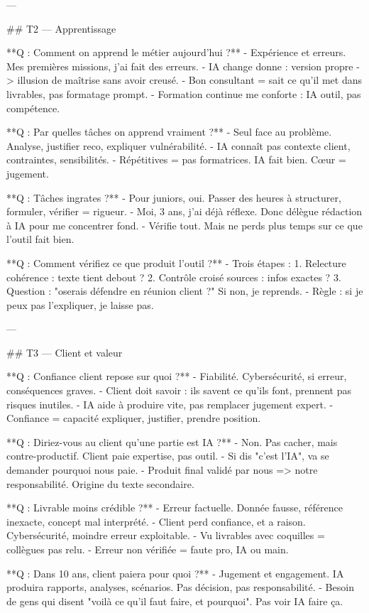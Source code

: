---

## T2 — Apprentissage

**Q : Comment on apprend le métier aujourd'hui ?**
- Expérience et erreurs. Mes premières missions, j'ai fait des erreurs.
- IA change donne : version propre -> illusion de maîtrise sans avoir creusé.
- Bon consultant = sait ce qu'il met dans livrables, pas formatage prompt.
- Formation continue me conforte : IA outil, pas compétence.

**Q : Par quelles tâches on apprend vraiment ?**
- Seul face au problème. Analyse, justifier reco, expliquer vulnérabilité.
- IA connaît pas contexte client, contraintes, sensibilités.
- Répétitives = pas formatrices. IA fait bien. Cœur = jugement.

**Q : Tâches ingrates ?**
- Pour juniors, oui. Passer des heures à structurer, formuler, vérifier = rigueur.
- Moi, 3 ans, j'ai déjà réflexe. Donc délègue rédaction à IA pour me concentrer fond.
- Vérifie tout. Mais ne perds plus temps sur ce que l'outil fait bien.

**Q : Comment vérifiez ce que produit l'outil ?**
- Trois étapes :
  1. Relecture cohérence : texte tient debout ?
  2. Contrôle croisé sources : infos exactes ?
  3. Question : "oserais défendre en réunion client ?" Si non, je reprends.
- Règle : si je peux pas l'expliquer, je laisse pas.

---

## T3 — Client et valeur

**Q : Confiance client repose sur quoi ?**
- Fiabilité. Cybersécurité, si erreur, conséquences graves.
- Client doit savoir : ils savent ce qu'ils font, prennent pas risques inutiles.
- IA aide à produire vite, pas remplacer jugement expert.
- Confiance = capacité expliquer, justifier, prendre position.

**Q : Diriez-vous au client qu'une partie est IA ?**
- Non. Pas cacher, mais contre-productif. Client paie expertise, pas outil.
- Si dis "c'est l'IA", va se demander pourquoi nous paie.
- Produit final validé par nous => notre responsabilité. Origine du texte secondaire.

**Q : Livrable moins crédible ?**
- Erreur factuelle. Donnée fausse, référence inexacte, concept mal interprété.
- Client perd confiance, et a raison. Cybersécurité, moindre erreur exploitable.
- Vu livrables avec coquilles = collègues pas relu.
- Erreur non vérifiée = faute pro, IA ou main.

**Q : Dans 10 ans, client paiera pour quoi ?**
- Jugement et engagement. IA produira rapports, analyses, scénarios. Pas décision, pas responsabilité.
- Besoin de gens qui disent "voilà ce qu'il faut faire, et pourquoi". Pas voir IA faire ça.

